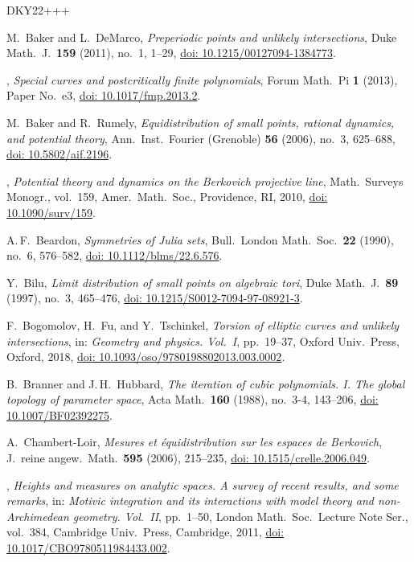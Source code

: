 \documentclass[10pt,a4paper]{amsart}
\numberwithin{equation}{section}
\theoremstyle{plain}
\theoremstyle{definition}
\theoremstyle{remark}
\providecommand{\doi}[1]{\href{https://doi.org/#1}{doi: #1}}
\begin{document}
\begin{thebibliography}{DKY22+++}
  
M.~Baker and L.~DeMarco,
\emph{Preperiodic points and unlikely intersections},
Duke Math.~J.\ \textbf{159} (2011), no.~1, 1--29,
\doi{10.1215/00127094-1384773}.

\bysame, 
\emph{Special curves and postcritically finite polynomials},
Forum Math.\ Pi \textbf{1} (2013), Paper No.~e3,
\doi{10.1017/fmp.2013.2}.

M.~Baker and R.~Rumely,
\emph{Equidistribution of small points, rational dynamics, and potential theory}, Ann.\ Inst.\ Fourier (Grenoble) \textbf{56} (2006), no.~3, 625--688,
\doi{10.5802/aif.2196}.

\bysame,
\emph{Potential theory and dynamics on the Berkovich projective line},
Math.\ Surveys  Monogr., vol.~159,
Amer.\ Math.\ Soc., Providence, RI, 2010, \doi{10.1090/surv/159}.

A.\,F.~Beardon,
\emph{Symmetries of Julia sets},
Bull.\ London Math.\ Soc.\ \textbf{22} (1990), no.~6, 576--582,
\doi{10.1112/blms/22.6.576}.

Y.~Bilu,
\emph{Limit distribution of small points on algebraic tori},
Duke Math.~J.\ \textbf{89} (1997), no.~3, 465--476,
\doi{10.1215/S0012-7094-97-08921-3}.

F.~Bogomolov, H.~Fu, and Y.~Tschinkel,
\emph{Torsion of elliptic curves and unlikely intersections}, in:
\emph{Geometry and physics. Vol.~I}, pp.~19--37, Oxford Univ.\ Press, Oxford, 2018, \doi{10.1093/oso/9780198802013.003.0002}.

B.~Branner and J.\,H.~Hubbard,
\emph{The iteration of cubic polynomials. I. The global topology of parameter space},
Acta Math.\ \textbf{160} (1988), no.~3-4, 143--206,
\doi{10.1007/BF02392275}.

A.~Chambert-Loir,
\emph{Mesures et \'equidistribution sur les espaces de Berkovich},
J.~reine angew.\ Math.\ \textbf{595} (2006), 215--235,
\doi{10.1515/crelle.2006.049}.

\bysame,
\emph{Heights and measures on analytic spaces. A survey of recent results, and some remarks},
in: \emph{Motivic integration and its interactions with model theory and non-Archimedean geometry. Vol.~II}, pp.~1--50,
London Math.\ Soc.\ Lecture Note Ser., vol.~384,
Cambridge Univ.\ Press, Cambridge, 2011,
\doi{10.1017/CBO9780511984433.002}.


\end{thebibliography}
\end{document}

